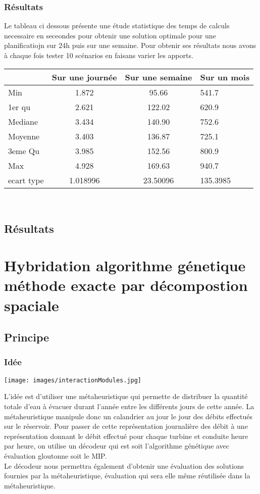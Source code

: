 \documentclass[a4paper]{report}
\begin{document}
\subsubsection{Résultats}
Le tableau ci dessous présente une étude statistique des temps de calculs necessaire en seceondes pour obtenir une solution optimale pour une planificatiojn sur 24h puis sur une semaine. Pour obtenir ses résultats nous avons à chaque fois tester 10 scénarios en faisans varier les apports.\\
\begin{tabular}{|l|c|c|l|}
  \hline
  &Sur une journée&Sur une semaine&Sur un mois\\
  \hline
  Min &1.872 &95.66 & 541.7\\
  \hline
  1er qu & 2.621&122.02 & 620.9
\\
  \hline
  Mediane & 3.434&140.90 & 752.6
\\
  \hline
  Moyenne &3.403& 136.87 & 725.1
\\
  \hline
  3eme Qu &3.985&152.56 & 800.9\\
  \hline
  Max & 4.928 &169.63 &940.7\\
\hline
 ecart type &1.018996 & 23.50096 & 135.3985\\
 
  \hline
\end{tabular}
\\
\subsection{Résultats}
\section{Hybridation algorithme génetique méthode exacte par décompostion spaciale}
\subsection{Principe}
\subsubsection{Idée}
\begin{center}
\texttt{[image: images/interactionModules.jpg]}
\end{center}
L'idée est d'utiliser une métaheuristique qui permette de distribuer la quantité totale d'eau à évacuer durant l'année entre les différents jours de cette année.  La métaheuristique manipule donc un calandrier au jour le jour des débits effectués sur le réservoir. Pour passer de cette représentation journalière des débit à une représentation donnant le débit effectué pour chaque turbine et conduite heure par heure, on utilise un décodeur qui est soit l'algorithme génétique avec évaluation gloutonne soit le MIP.\\
Le décodeur nous permettra également d'obtenir une évaluation des solutions fournies par la métaheuristique, évaluation qui sera elle même réutilisée dans la métaheuristique.\\
\end{document}
